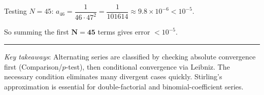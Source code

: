 \documentclass[12pt,a4paper]{article}
\begin{document}
Testing $N=45$: $a_{46}=\dfrac{1}{46\cdot47^2}=\dfrac{1}{101614}\approx 9.8\times 10^{-6}<10^{-5}$.

So summing the first $\mathbf{N=45}$ terms gives error $< 10^{-5}$.

\bigskip
\hrule
\bigskip
\textit{Key takeaways}: Alternating series are classified by checking absolute convergence first (Comparison/$p$-test), then conditional convergence via Leibniz.  The necessary condition eliminates many divergent cases quickly.  Stirling's approximation is essential for double-factorial and binomial-coefficient series.
\end{document}

